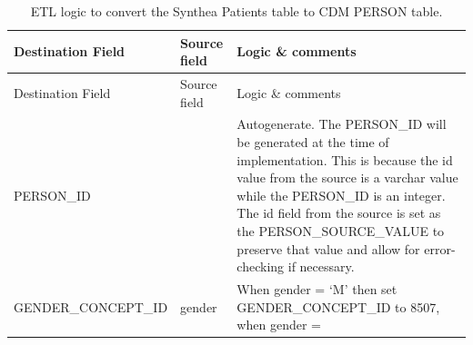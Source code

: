 \documentclass[11pt]{book}
\theoremstyle{definition}
\theoremstyle{definition}
\theoremstyle{definition}
\theoremstyle{remark}
\begin{document}
\begin{longtable}[]{@{}lll@{}}
\caption{\label{tab:syntheaEtlPerson} ETL logic to convert the Synthea
Patients table to CDM PERSON table.}\tabularnewline
\toprule
\begin{minipage}[b]{0.28\columnwidth}\raggedright\strut
Destination Field\strut
\end{minipage} & \begin{minipage}[b]{0.13\columnwidth}\raggedright\strut
Source field\strut
\end{minipage} & \begin{minipage}[b]{0.50\columnwidth}\raggedright\strut
Logic \& comments\strut
\end{minipage}\tabularnewline
\midrule
\endfirsthead
\toprule
\begin{minipage}[b]{0.28\columnwidth}\raggedright\strut
Destination Field\strut
\end{minipage} & \begin{minipage}[b]{0.13\columnwidth}\raggedright\strut
Source field\strut
\end{minipage} & \begin{minipage}[b]{0.50\columnwidth}\raggedright\strut
Logic \& comments\strut
\end{minipage}\tabularnewline
\midrule
\endhead
\begin{minipage}[t]{0.28\columnwidth}\raggedright\strut
PERSON\_ID\strut
\end{minipage} & \begin{minipage}[t]{0.13\columnwidth}\raggedright\strut
\strut
\end{minipage} & \begin{minipage}[t]{0.50\columnwidth}\raggedright\strut
Autogenerate. The PERSON\_ID will be generated at the time of
implementation. This is because the id value from the source is a
varchar value while the PERSON\_ID is an integer. The id field from the
source is set as the PERSON\_SOURCE\_VALUE to preserve that value and
allow for error-checking if necessary.\strut
\end{minipage}\tabularnewline
\begin{minipage}[t]{0.28\columnwidth}\raggedright\strut
GENDER\_CONCEPT\_ID\strut
\end{minipage} & \begin{minipage}[t]{0.13\columnwidth}\raggedright\strut
gender\strut
\end{minipage} & \begin{minipage}[t]{0.50\columnwidth}\raggedright\strut
When gender = `M' then set GENDER\_CONCEPT\_ID to 8507, when gender =

\end{minipage}
\end{longtable}
\end{document}
